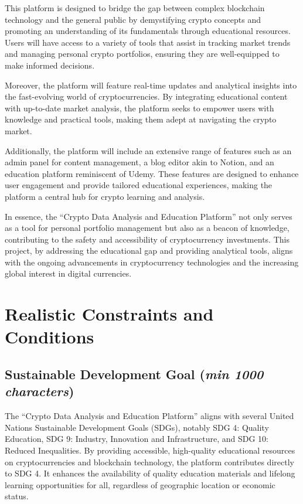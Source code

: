 \documentclass[12pt]{report}
\newcommand{\characters}[1]{(\textit{min #1 characters})}
\begin{document}
This platform is designed to bridge the gap between complex blockchain technology and the general public by demystifying crypto concepts and promoting an understanding of its fundamentals through educational resources. Users will have access to a variety of tools that assist in tracking market trends and managing personal crypto portfolios, ensuring they are well-equipped to make informed decisions.

Moreover, the platform will feature real-time updates and analytical insights into the fast-evolving world of cryptocurrencies. By integrating educational content with up-to-date market analysis, the platform seeks to empower users with knowledge and practical tools, making them adept at navigating the crypto market.

Additionally, the platform will include an extensive range of features such as an admin panel for content management, a blog editor akin to Notion, and an education platform reminiscent of Udemy. These features are designed to enhance user engagement and provide tailored educational experiences, making the platform a central hub for crypto learning and analysis.

In essence, the ``Crypto Data Analysis and Education Platform'' not only serves as a tool for personal portfolio management but also as a beacon of knowledge, contributing to the safety and accessibility of cryptocurrency investments. This project, by addressing the educational gap and providing analytical tools, aligns with the ongoing advancements in cryptocurrency technologies and the increasing global interest in digital currencies.


\section{Realistic Constraints and Conditions}

\subsection{Sustainable Development Goal \characters{1000}}
The ``Crypto Data Analysis and Education Platform'' aligns with several United Nations Sustainable Development Goals (SDGs), notably SDG 4: Quality Education, SDG 9: Industry, Innovation and Infrastructure, and SDG 10: Reduced Inequalities. By providing accessible, high-quality educational resources on cryptocurrencies and blockchain technology, the platform contributes directly to SDG 4. It enhances the availability of quality education materials and lifelong learning opportunities for all, regardless of geographic location or economic status.
\end{document}
